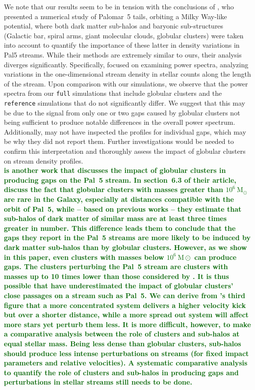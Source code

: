 \documentclass{aa}
\newcommand{\salvatore}[1]{\textcolor{darkgreen}{{#1}}}
\begin{document}
  We note that our results seem to be in tension with the conclusions of \citet{2019MNRAS.484.2009B}, who presented a numerical study of Palomar~5 tails, orbiting a Milky Way-like potential, where both dark matter sub-halos and baryonic sub-structures (Galactic bar, spiral arms, giant molecular clouds, globular clusters) were taken into account to quantify the importance of these latter in density variations in Pal5 streams. While their methods are extremely similar to ours, their analysis diverges significantly. Specifically, \citet{2019MNRAS.484.2009B} focused on examining power spectra, analyzing variations in the one-dimensional stream density in stellar counts along the length of the stream. Upon comparison with our simulations, we observe that the power spectra from our \texttt{full} simulations that include globular clusters and the \texttt{reference} simulations that do not significantly differ. We suggest that this may be due to the signal from only one or two gaps caused by globular clusters not being sufficient to produce notable differences in the overall power spectrum. Additionally, \citet{2019MNRAS.484.2009B} may not have inspected the profiles for individual gaps, which may be why they did not report them. Further investigations would be needed to confirm this interpretation and thoroughly assess the impact of globular clusters on stream density profiles. \\

  \textbf{ \salvatore{\citet{2017MNRAS.470...60E} is another work that discusses the impact of globular clusters in producing gaps on the Pal~5 stream. In section~6.3 of their article, \citet{2017MNRAS.470...60E} discuss the fact that globular clusters with masses greater than $10^6~\textrm{M}_\odot$ are rare in the Galaxy, especially at distances compatible with the orbit of Pal~5, while -- based on previous works -- they estimate that sub-halos of dark matter of similar mass are at least three times greater in number. This difference leads them to conclude that the gaps they report in the Pal~5 streams are more likely to be induced by dark matter sub-halos than by globular clusters. 
  However, as we show in this paper, even clusters with masses below $10^6~\textrm{M}\odot$ can produce gaps. The clusters perturbing the Pal~5 stream are clusters with masses up to 10 times lower than those considered by \citet{2017MNRAS.470...60E}. It is thus possible that \citet{2017MNRAS.470...60E} have underestimated the impact of globular clusters' close passages on a stream such as Pal~5. We can derive from \citet{2016MNRAS.457.3817S}'s third figure that a more concentrated system delivers a higher velocity kick but over a shorter distance, while a more spread out system will affect more stars yet perturb them less. It is more difficult, however, to make a comparative analysis between the role of clusters and sub-halos at equal stellar mass. Being less dense than globular clusters, sub-halos should produce less intense perturbations on streams (for fixed impact parameters and relative velocities). A systematic comparative analysis to quantify the role of clusters and sub-halos in producing gaps and perturbations in stellar streams still needs to be done.}}
\end{document}
